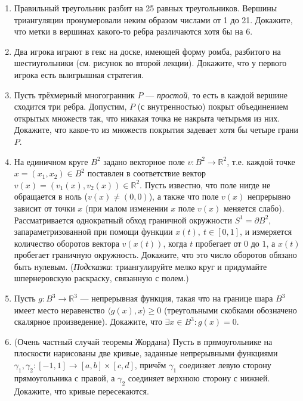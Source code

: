 \documentclass[12pt]{article}
\def\ra{\rightarrow}
\def\RR{\mathbb{R}}
\begin{document}
\begin{enumerate}
  \item Правильный треугольник разбит на 25 равных треугольников. Вершины триангуляции пронумеровали неким образом числами от 1 до 21. Докажите, что метки в вершинах какого-то ребра различаются хотя бы на 6.

  \item Два игрока играют в гекс на доске, имеющей форму ромба, разбитого на шестиугольники (см. рисунок во второй лекции). Докажите, что у первого игрока есть выигрышная стратегия.

  \item Пусть трёхмерный многогранник $P$ --- \emph{простой}, то есть в каждой вершине сходится три ребра. Допустим, $P$ (с внутренностью) покрыт объединением открытых множеств так, что никакая точка не накрыта четырьмя из них. Докажите, что какое-то из множеств покрытия задевает хотя бы четыре грани $P$.

  \item На единичном круге $B^2$ задано векторное поле $v: B^2 \ra \RR^2$, т.е. каждой точке $x = (x_1,x_2) \in B^2$ поставлен в соответствие вектор $v(x) = (v_1(x), v_2(x)) \in \RR^2$. Пусть известно, что поле нигде не обращается в ноль ($v(x) \neq (0,0)$), а также что поле $v(x)$ непрерывно зависит от точки $x$ (при малом изменении $x$ поле $v(x)$ меняется слабо). Рассматривается однократный обход граничной окружности $S^1 = \partial B^2$, запараметризованной при помощи функции $x(t), \ t\in[0,1]$, и измеряется количество оборотов вектора $v(x(t))$, когда $t$ пробегает от $0$ до $1$, а $x(t)$ пробегает граничную окружность. Докажите, что это число оборотов обязано быть нулевым.
  (\emph{Подсказка}: триангулируйте мелко круг и придумайте шпернеровскую раскраску, связанную с полем.)

  \item Пусть $g : B^3 \ra \RR^3$ --- непрерывная функция, такая что на границе шара $B^3$ имеет место неравенство $\langle g(x),x \rangle \geqslant 0$ (треугольными скобками обозначено скалярное произведение). Докажите, что $\exists x \in B^3 : g(x)=0$.

  \item (Очень частный случай теоремы Жордана) Пусть в прямоугольнике на плоскости нарисованы две кривые, заданные непрерывными функциями $\gamma_1, \gamma_2: [-1,1] \to [a,b]\times [c,d]$, причём $\gamma_1$ соединяет левую сторону прямоугольника с правой, а $\gamma_2$ соединяет верхнюю сторону с нижней. Докажите, что кривые пересекаются.



\end{enumerate}
\end{document}
